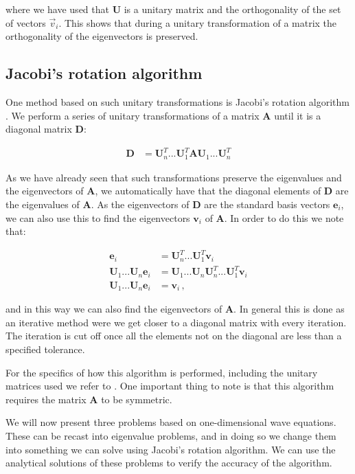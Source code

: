 \documentclass[reprint,english,notitlepage]{revtex4-1}  %
\begin{document}
where we have used that $\textbf{U}$ is a unitary matrix and the orthogonality of the set of vectors $\vec{v}_i$. This shows that during a unitary transformation of a matrix the orthogonality of the eigenvectors is preserved.


\subsection{Jacobi's rotation algorithm} \label{sec:II:b}

One method based on such unitary transformations is Jacobi's rotation algorithm \citep{Jacobi1846}. We perform a series of unitary transformations of a matrix \textbf{A} until it is a diagonal matrix \textbf{D}:

\begin{align*}
\textbf{D} &= \textbf{U}_n^T ... \textbf{U}_1^T \textbf{AU}_1 ... \textbf{U}_n^T
\end{align*}

As we have already seen that such transformations preserve the eigenvalues and the eigenvectors of \textbf{A}, we automatically have that the diagonal elements of \textbf{D} are the eigenvalues of \textbf{A}. As the eigenvectors of \textbf{D} are the standard basis vectors $\textbf{e}_i$, we can also use this to find the eigenvectors $\textbf{v}_i$ of \textbf{A}. In order to do this we note that:

\begin{align*}
\textbf{e}_i &= \textbf{U}_n^T ... \textbf{U}_1^T \textbf{v}_i \\
\textbf{U}_1 ... \textbf{U}_n \textbf{e}_i &= \textbf{U}_1 ... \textbf{U}_n \textbf{U}_n^T ... \textbf{U}_1^T \textbf{v}_i \\
\textbf{U}_1 ... \textbf{U}_n \textbf{e}_i &= \textbf{v}_i \, ,
\end{align*}

and in this way we can also find the eigenvectors of \textbf{A}. In general this is done as an iterative method were we get closer to a diagonal matrix with every iteration. The iteration is cut off once all the elements not on the diagonal are less than a specified tolerance.

For the specifics of how this algorithm is performed, including the unitary matrices used we refer to \citep{Hjorth-Jensen2015}. One important thing to note is that this algorithm requires the matrix \textbf{A} to be symmetric.

We will now present three problems based on one-dimensional wave equations. These can be recast into eigenvalue problems, and in doing so we change them into something we can solve using Jacobi's rotation algorithm. We can use the analytical solutions of these problems to verify the accuracy of the algorithm.
\end{document}
